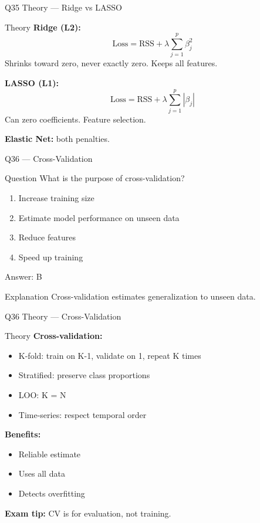 \documentclass[aspectratio=169,8pt]{beamer}
\begin{document}
	\begin{frame}{Q35 Theory --- Ridge vs LASSO}
		\begin{block}{Theory}
			\textbf{Ridge (L2):}
			\[
			\text{Loss} = \text{RSS} + \lambda \sum_{j=1}^{p} \beta_j^2
			\]
			Shrinks toward zero, never exactly zero. Keeps all features.
			\vspace{2mm}
			
			\textbf{LASSO (L1):}
			\[
			\text{Loss} = \text{RSS} + \lambda \sum_{j=1}^{p} |\beta_j|
			\]
			Can zero coefficients. Feature selection.
			\vspace{2mm}
			
			\textbf{Elastic Net:} both penalties.
		\end{block}
	\end{frame}
	
	\begin{frame}{Q36 --- Cross-Validation}
		\begin{block}{Question}
			What is the purpose of cross-validation?
		\end{block}
		\begin{enumerate}[label=\Alph*.]
			\item Increase training size
			\item Estimate model performance on unseen data
			\item Reduce features
			\item Speed up training
		\end{enumerate}
		\begin{exampleblock}{Answer: B}
		\end{exampleblock}
		\begin{block}{Explanation}
			Cross-validation estimates generalization to unseen data.
		\end{block}
	\end{frame}
	
	\begin{frame}{Q36 Theory --- Cross-Validation}
		\begin{block}{Theory}
			\textbf{Cross-validation:}
			\begin{itemize}
				\item K-fold: train on K-1, validate on 1, repeat K times
				\item Stratified: preserve class proportions
				\item LOO: K = N
				\item Time-series: respect temporal order
			\end{itemize}
			\textbf{Benefits:}
			\begin{itemize}
				\item Reliable estimate
				\item Uses all data
				\item Detects overfitting
			\end{itemize}
			\textbf{Exam tip:} CV is for evaluation, not training.
		\end{block}
	\end{frame}
	
\end{document}
